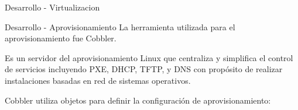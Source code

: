 \begin{frame}{Desarrollo - Virtualizacion}
    \vspace{-1.5cm}
    \begin{figure}[ht]
       \centering
       \vspace{-0.50cm}
    \end{figure}

\end{frame}

\begin{frame}{Desarrollo - Aprovisionamiento}
    \vspace{-1.5cm}
    La herramienta utilizada para el aprovisionamiento fue Cobbler.
    \begin{block}{}
        Es un servidor del aprovisionamiento Linux que centraliza y simplifica el control de servicios incluyendo PXE, DHCP, TFTP, y DNS con propósito de realizar instalaciones basadas en red de sistemas operativos.
    \end{block}

    \begin{block}{}
        Cobbler utiliza objetos para definir la configuración de aprovisionamiento:
    \end{block}

\end{frame}

